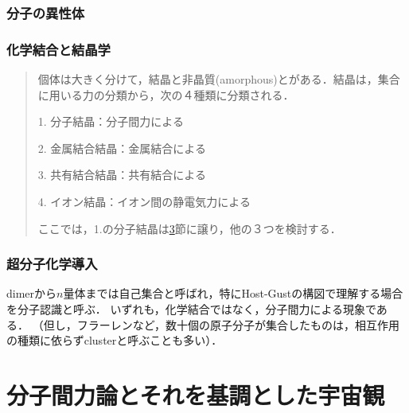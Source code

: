 \documentclass[uplatex, dvipdfmx]{jsreport}
\begin{document}
\section{分子の異性体}

\section{化学結合と結晶学}
\begin{quotation}
    個体は大きく分けて，結晶と非晶質(amorphous)とがある．結晶は，集合に用いる力の分類から，次の４種類に分類される．

    1. 分子結晶：分子間力による

    2. 金属結合結晶：金属結合による

    3. 共有結合結晶：共有結合による

    4. イオン結晶：イオン間の静電気力による

    ここでは，1.の分子結晶は\ref{section-self-assembly}節に譲り，他の３つを検討する．
\end{quotation}

\section{超分子化学導入}\label{section-self-assembly}

dimerから$n$量体までは自己集合と呼ばれ，特にHost-Gustの構図で理解する場合を分子認識と呼ぶ．
いずれも，化学結合ではなく，分子間力による現象である．
（但し，フラーレンなど，数十個の原子分子が集合したものは，相互作用の種類に依らずclusterと呼ぶことも多い）．


\part{分子間力論とそれを基調とした宇宙観}\label{part-supermolecule}
\end{document}
